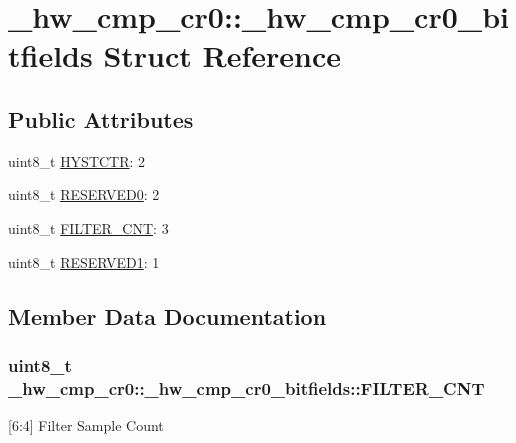\hypertarget{struct__hw__cmp__cr0_1_1__hw__cmp__cr0__bitfields}{}\section{\+\_\+hw\+\_\+cmp\+\_\+cr0\+:\+:\+\_\+hw\+\_\+cmp\+\_\+cr0\+\_\+bitfields Struct Reference}
\label{struct__hw__cmp__cr0_1_1__hw__cmp__cr0__bitfields}
\subsection*{Public Attributes}
\begin{DoxyCompactItemize}
\item 
uint8\+\_\+t \hyperlink{struct__hw__cmp__cr0_1_1__hw__cmp__cr0__bitfields_aa63ffa0890adc357e7fe6f0000340375}{H\+Y\+S\+T\+C\+TR}\+: 2
\item 
uint8\+\_\+t \hyperlink{struct__hw__cmp__cr0_1_1__hw__cmp__cr0__bitfields_a39ad7e4fa627559595d5cb3f0cf5863d}{R\+E\+S\+E\+R\+V\+E\+D0}\+: 2
\item 
uint8\+\_\+t \hyperlink{struct__hw__cmp__cr0_1_1__hw__cmp__cr0__bitfields_ab1026371a4ecca8d5a1e92041112e7ee}{F\+I\+L\+T\+E\+R\+\_\+\+C\+NT}\+: 3
\item 
uint8\+\_\+t \hyperlink{struct__hw__cmp__cr0_1_1__hw__cmp__cr0__bitfields_a685e29d750556032aca758f1f1de9497}{R\+E\+S\+E\+R\+V\+E\+D1}\+: 1
\end{DoxyCompactItemize}


\subsection{Member Data Documentation}
\subsubsection[{\texorpdfstring{F\+I\+L\+T\+E\+R\+\_\+\+C\+NT}{FILTER_CNT}}]{\setlength{\rightskip}{0pt plus 5cm}uint8\+\_\+t \+\_\+hw\+\_\+cmp\+\_\+cr0\+::\+\_\+hw\+\_\+cmp\+\_\+cr0\+\_\+bitfields\+::\+F\+I\+L\+T\+E\+R\+\_\+\+C\+NT}\hypertarget{struct__hw__cmp__cr0_1_1__hw__cmp__cr0__bitfields_ab1026371a4ecca8d5a1e92041112e7ee}{}\label{struct__hw__cmp__cr0_1_1__hw__cmp__cr0__bitfields_ab1026371a4ecca8d5a1e92041112e7ee}
\mbox{[}6\+:4\mbox{]} Filter Sample Count 
